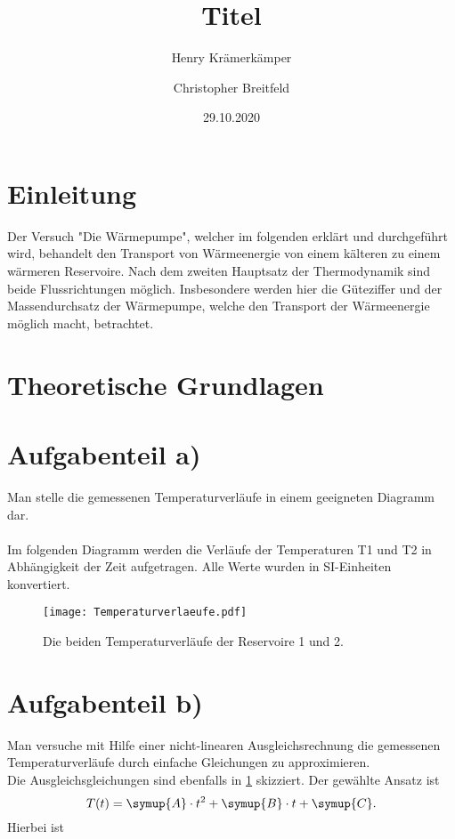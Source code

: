 \documentclass{scrartcl} %
\begin{document}
\title{Titel}
\author{Henry Krämerkämper \and Christopher Breitfeld}
\date{29.10.2020}
\maketitle
\newpage
\tableofcontents
\newpage
\section{Einleitung}
Der Versuch "Die Wärmepumpe", welcher im folgenden erklärt und durchgeführt wird, behandelt den Transport von
Wärmeenergie von einem kälteren zu einem wärmeren Reservoire. Nach dem zweiten Hauptsatz der Thermodynamik sind beide
Flussrichtungen möglich. Insbesondere werden hier die Güteziffer und der Massendurchsatz der Wärmepumpe, welche den Transport der
Wärmeenergie möglich macht, betrachtet.
\section{Theoretische Grundlagen}

\section{Aufgabenteil a)}
  Man stelle die gemessenen Temperaturverläufe in einem geeigneten Diagramm dar. \\
  \\
  Im folgenden Diagramm werden die Verläufe der Temperaturen T1 und T2 in Abhängigkeit der Zeit aufgetragen.
  Alle Werte wurden in SI-Einheiten konvertiert.
  \\
  \begin{figure}
    \centering
    \texttt{[image: Temperaturverlaeufe.pdf]}
    \caption{Die beiden Temperaturverläufe der Reservoire 1 und 2.}
    \label{fig:TemperaturverlaufA}
  \end{figure}
\section{Aufgabenteil b)}
  Man versuche mit Hilfe einer nicht-linearen Ausgleichsrechnung die gemessenen Temperaturverläufe durch einfache Gleichungen zu approximieren.
  \\
  Die Ausgleichsgleichungen sind ebenfalls in \ref{fig:TemperaturverlaufA} skizziert. Der gewählte Ansatz ist
  \begin{equation}
    T(t) = \symup{A} \cdot t^2 + \symup{B} \cdot t + \symup{C}.
    \label{eq:Regressionsgleichung}
  \end{equation}
  Hierbei ist
\end{document}
